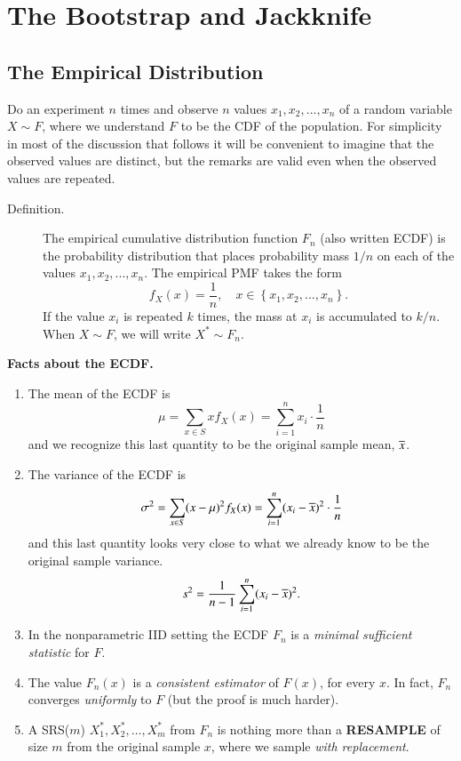 \documentclass[captions=tableheading]{scrbook}
\begin{document}
\chapter{The Bootstrap and Jackknife}
\label{sec-4}
\section{The Empirical Distribution}
\label{sec-4_1}


Do an experiment $n$ times and observe $n$ values \(x_{1}, x_{2}, ..., x_{n}\) of a random variable \(X \sim F\), where we understand $F$ to be the CDF of the population. For simplicity in most of the discussion that follows it will be convenient to imagine that the observed values are distinct, but the remarks are valid even when the observed values are repeated. 


\begin{description}
\item[Definition.] The empirical cumulative distribution function \(F_{n}\) (also written ECDF) is the probability distribution that places probability mass \(1/n\) on each of the values \(x_{1}, x_{2}, ..., x_{n}\). The empirical PMF takes the form 
  \begin{equation*}
  f_{X}(x)=\frac{1}{n},\quad x\in\left\{ x_{1},x_{2},...,x_{n}\right\}.
  \end{equation*}
  If the value \(x_{i}\) is repeated \(k\) times, the mass at \(x_{i}\) is accumulated to \(k/n\).  When $X \sim F$, we will write $X^{\ast} \sim F_{n}$.
\end{description}

\bigskip
\textbf{Facts about the ECDF.}


\begin{enumerate}
\item The mean of the ECDF is
   \[
   \mu=\sum_{x\in S}xf_{X}(x)=\sum_{i=1}^{n}x_{i}\cdot\frac{1}{n}
   \]
   and we recognize this last quantity to be the original sample mean, \(\overline{x}\).
\item The variance of the ECDF is
   \[
   \sigma^{2}=\sum_{x\in S}(x-\mu)^{2}f_{X}(x)=\sum_{i=1}^{n}(x_{i}-\overline{x})^{2}\cdot\frac{1}{n}
   \]
   and this last quantity looks very close to what we already know to be the original sample variance.
   \[
   s^{2}=\frac{1}{n-1}\sum_{i=1}^{n}(x_{i}-\overline{x})^{2}.
   \]
\item In the nonparametric IID setting the ECDF $F_{n}$ is a \emph{minimal sufficient statistic} for $F$.
\item The value $F_{n}(x)$ is a \emph{consistent estimator} of $F(x)$, for every $x$.  In fact, $F_{n}$ converges \emph{uniformly} to $F$ (but the proof is much harder).
\item A SRS($m$) \(X_{1}^{\ast},X_{2}^{\ast},\ldots,X_{m}^{\ast}\) from $F_{n}$ is nothing more than a \textbf{RESAMPLE} of size $m$ from the original sample $x$, where we sample \emph{with replacement}.
\end{enumerate}
\end{document}
